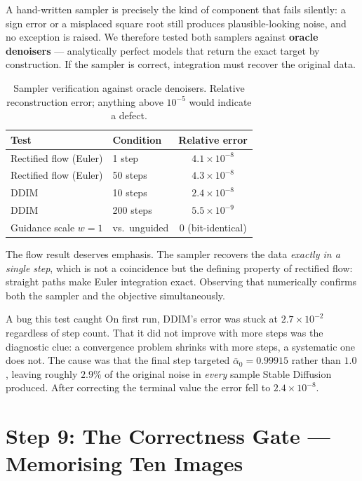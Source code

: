 \documentclass[11pt,a4paper]{article}
\newcommand{\step}[1]{\section{#1}}
\begin{document}
A hand-written sampler is precisely the kind of component that fails silently: a
sign error or a misplaced square root still produces plausible-looking noise, and
no exception is raised. We therefore tested both samplers against \textbf{oracle
denoisers} --- analytically perfect models that return the exact target by
construction. If the sampler is correct, integration must recover the original
data.

\begin{table}[htbp]
\centering
\caption{Sampler verification against oracle denoisers. Relative reconstruction
error; anything above $10^{-5}$ would indicate a defect.}
\begin{tabular}{@{}llc@{}}
\toprule
\textbf{Test} & \textbf{Condition} & \textbf{Relative error} \\
\midrule
Rectified flow (Euler) & 1 step & $4.1\times10^{-8}$ \\
Rectified flow (Euler) & 50 steps & $4.3\times10^{-8}$ \\
DDIM & 10 steps & $2.4\times10^{-8}$ \\
DDIM & 200 steps & $5.5\times10^{-9}$ \\
Guidance scale $w=1$ & vs.\ unguided & $0$ (bit-identical) \\
\bottomrule
\end{tabular}
\end{table}

The flow result deserves emphasis. The sampler recovers the data \emph{exactly
in a single step}, which is not a coincidence but the defining property of
rectified flow: straight paths make Euler integration exact. Observing that
numerically confirms both the sampler and the objective simultaneously.

\begin{lesson}{A bug this test caught}
On first run, DDIM's error was stuck at $2.7\times10^{-2}$ regardless of step
count. That it did not improve with more steps was the diagnostic clue: a
convergence problem shrinks with more steps, a systematic one does not. The
cause was that the final step targeted $\bar\alpha_0 = 0.99915$ rather than
$1.0$, leaving roughly $2.9\%$ of the original noise in \emph{every} sample
Stable Diffusion produced. After correcting the terminal value the error fell to
$2.4\times10^{-8}$.
\end{lesson}

\step{Step 9: The Correctness Gate --- Memorising Ten Images}
\end{document}
